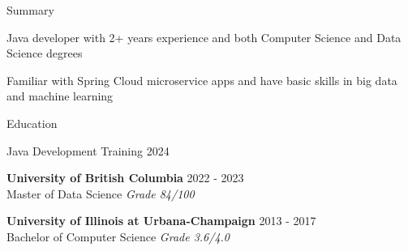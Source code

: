 \documentclass{resume} %
\begin{document}
\begin{skillSection}{Summary}
\item Java developer with 2+ years experience and both Computer Science and Data Science degrees
\item Familiar with Spring Cloud microservice apps and have basic skills in big data and machine learning
\end{skillSection}


\begin{rSection}{Education}

{Java Development Training} \hfill {2024}

{\bf University of British Columbia} \hfill {2022 - 2023}
\\ Master of Data Science \hfill {\em{Grade 84/100}}

{\bf University of Illinois at Urbana-Champaign} \hfill {2013 - 2017}
\\ Bachelor of Computer Science \hfill {\em{Grade 3.6/4.0}}

\end{rSection}

\end{document}
